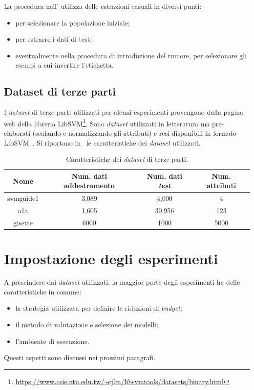 La procedura nell' utilizza delle estrazioni casuali in diversi punti:
\begin{itemize}
    \item per selezionare la popolazione iniziale;
    \item per estrarre i dati di test;
    \item eventualmente nella procedura di introduzione del rumore, per selezionare gli esempi a cui invertire l'etichetta.
\end{itemize}

\subsection{Dataset di terze parti}
I \emph{dataset} di terze parti utilizzati per alcuni esperimenti provengono dalla pagina web della libreria LibSVM\footnote{\url{https://www.csie.ntu.edu.tw/~cjlin/libsvmtools/datasets/binary.html}}.
Sono \emph{dataset} utilizzati in letteratura ma pre-elaborati (scalando e normalizzando gli attributi) e resi disponibili in formato LibSVM~\cite{libsvm}.
Si riportano in~ le caratteristiche dei \emph{dataset} utilizzati.
\begin{table}
    \centering
    \begin{tabular}{cccc}
        \toprule
        Nome & Num. dati addestramento & Num. dati \emph{test} & Num. attributi\\
        \midrule
        svmguide1 &  3,089 & 4,000 & 4 \\
        a1a & 1,605	& 30,956 & 123\\
        gisette & 6000 & 1000 & 5000 \\
        \bottomrule
    \end{tabular}
    \caption{Caratteristiche dei \emph{dataset} di terze parti.}
    \label{tab:uci_datasets}
\end{table}


\section{Impostazione degli esperimenti}\label{sec:impostazione_esperimenti}
A prescindere dai \emph{dataset} utilizzati, la maggior parte degli esperimenti ha delle caratteristiche in comune:
\begin{itemize}
    \item la strategia utilizzata per definire le riduzioni di \emph{budget};
    \item il metodo di valutazione e selezione dei modelli;
    \item l'ambiente di esecuzione.
\end{itemize}
Questi aspetti sono discussi nei prossimi paragrafi.

